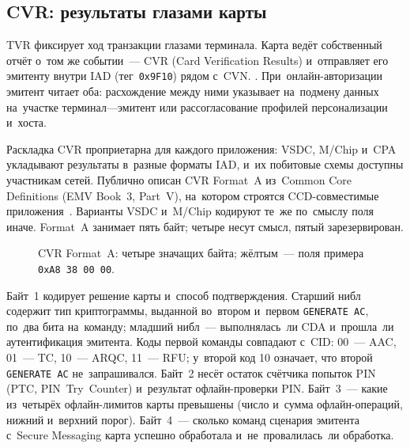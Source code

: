 \subsection*{CVR: результаты глазами карты}\label{sec:emv-cvr}

TVR фиксирует ход транзакции глазами терминала.
Карта ведёт собственный отчёт о~том же событии~--- CVR (Card Verification
Results) и~отправляет его эмитенту внутри IAD (тег~\texttt{0x9F10}) рядом
с~CVN. . При~онлайн-авторизации эмитент читает оба: расхождение между ними
указывает на~подмену данных на~участке терминал---эмитент или рассогласование
профилей персонализации и~хоста.

Раскладка CVR проприетарна для каждого приложения: VSDC, M\slash Chip и~CPA
укладывают результаты в~разные форматы IAD, и~их побитовые схемы доступны
участникам сетей. Публично описан CVR Format~A из~Common Core Definitions
(EMV Book~3, Part~V), на~котором строятся CCD-совместимые приложения~\cite{emvco-book3}.
Варианты VSDC и~M\slash Chip кодируют те~же по~смыслу поля иначе.
Format~A занимает пять байт;
четыре несут смысл, пятый зарезервирован.

\begin{figure}[tbp]
  \centering
  \caption{CVR Format~A: четыре значащих байта; жёлтым~--- поля примера \texttt{0xA8\,38\,00\,00}.}\label{fig:cvr-anatomy}
\end{figure}

Байт~1 кодирует решение карты и~способ подтверждения. Старший нибл содержит
тип криптограммы, выданной во~втором и~первом \texttt{GENERATE AC}, по~два бита
на~команду; младший нибл~--- выполнялась~ли CDA и~прошла~ли аутентификация
эмитента. Коды первой команды совпадают с~CID: 00~--- AAC, 01~--- TC,
10~--- ARQC, 11~--- RFU; у~второй код 10 означает, что второй
\texttt{GENERATE AC} не~запрашивался. Байт~2 несёт остаток счётчика попыток PIN (PTC,
PIN~Try~Counter) и~результат офлайн-проверки PIN. Байт~3~--- какие из~четырёх
офлайн-лимитов карты превышены (число и~сумма офлайн-операций, нижний и~верхний порог).
Байт~4~--- сколько команд сценария эмитента с~Secure Messaging карта
успешно обработала и~не~провалилась~ли обработка.


